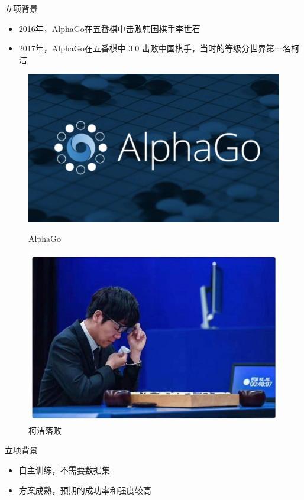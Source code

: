 \documentclass[compress]{beamer}
\begin{document}
\begin{frame}{立项背景}
  \begin{itemize}
    \item 2016年，AlphaGo在五番棋中击败韩国棋手李世石
    \item 2017年，AlphaGo在五番棋中 3:0 击败中国棋手，当时的等级分世界第一名柯洁        
  \end{itemize}
  \begin{figure}[htbp]
    \centering
	\begin{minipage}[t]{0.4\textwidth}
	  \centering
      \includegraphics[width=0.9\linewidth]{alphago.jpg}
      \caption{AlphaGo}
    \end{minipage}
    \begin{minipage}[t]{0.4\textwidth}
	  \centering
      \includegraphics[width=0.9\linewidth]{Kejie.jpg}
      \caption{柯洁落败}
    \end{minipage}
  \end{figure}
\end{frame}


\begin{frame}{立项背景}
  \begin{itemize}
    \item 自主训练，不需要数据集
          \pause
    \item 方案成熟，预期的成功率和强度较高
  \end{itemize}
\end{frame}
\end{document}
